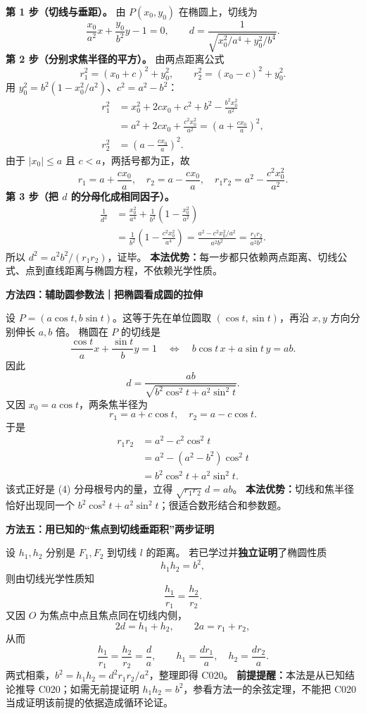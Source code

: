\begin{proofbox}
\textbf{第 1 步（切线与垂距）。}
由 $P(x_0,y_0)$ 在椭圆上，切线为
\[
\frac{x_0}{a^2}x+\frac{y_0}{b^2}y-1=0,
\qquad d=\frac{1}{\sqrt{x_0^2/a^4+y_0^2/b^4}}.
\]
\textbf{第 2 步（分别求焦半径的平方）。}
由两点距离公式
\[
r_1^2=(x_0+c)^2+y_0^2,\qquad
r_2^2=(x_0-c)^2+y_0^2.
\]
用 $y_0^2=b^2(1-x_0^2/a^2)$、$c^2=a^2-b^2$：
\[
\begin{aligned}
r_1^2
 &=x_0^2+2cx_0+c^2+b^2-\frac{b^2x_0^2}{a^2}\\
 &=a^2+2cx_0+\frac{c^2x_0^2}{a^2}
 =\left(a+\frac{cx_0}{a}\right)^2,\\
r_2^2
 &=\left(a-\frac{cx_0}{a}\right)^2.
\end{aligned}
\]
由于 $|x_0|\le a$ 且 $c<a$，两括号都为正，故
\[
r_1=a+\frac{cx_0}{a},\quad r_2=a-\frac{cx_0}{a},\quad
r_1r_2=a^2-\frac{c^2x_0^2}{a^2}.
\]
\textbf{第 3 步（把 $d$ 的分母化成相同因子）。}
\[
\begin{aligned}
\frac1{d^2}
 &=\frac{x_0^2}{a^4}+\frac{1}{b^2}\left(1-\frac{x_0^2}{a^2}\right)\\
 &=\frac1{b^2}\left(1-\frac{c^2x_0^2}{a^4}\right)
 =\frac{a^2-c^2x_0^2/a^2}{a^2b^2}
 =\frac{r_1r_2}{a^2b^2}.
\end{aligned}
\]
所以 $d^2=a^2b^2/(r_1r_2)$，证毕。
\textbf{本法优势：}每一步都只依赖两点距离、切线公式、点到直线距离与椭圆方程，不依赖光学性质。

\medskip
\textbf{\textcolor{CProof}{方法四：辅助圆参数法｜把椭圆看成圆的拉伸}}

设 $P=(a\cos t,b\sin t)$。这等于先在单位圆取 $(\cos t,\sin t)$，再沿 $x,y$ 方向分别伸长 $a,b$ 倍。
椭圆在 $P$ 的切线是
\[
\frac{\cos t}{a}x+\frac{\sin t}{b}y=1
\quad\Longleftrightarrow\quad
b\cos t\,x+a\sin t\,y=ab.
\]
因此
\[
\boxed{d=\frac{ab}{\sqrt{b^2\cos^2t+a^2\sin^2t}}}.\tag{4}
\]
又因 $x_0=a\cos t$，两条焦半径为
\[
r_1=a+c\cos t,\quad r_2=a-c\cos t.
\]
于是
\[
\begin{aligned}
r_1r_2
 &=a^2-c^2\cos^2t\\
 &=a^2-(a^2-b^2)\cos^2t\\
 &=b^2\cos^2t+a^2\sin^2t.
\end{aligned}
\]
该式正好是 (4) 分母根号内的量，立得
$\sqrt{r_1r_2}\,d=ab$。
\textbf{本法优势：}切线和焦半径恰好出现同一个 $b^2\cos^2t+a^2\sin^2t$；很适合数形结合和参数题。

\medskip
\textbf{\textcolor{CProof}{方法五：用已知的“焦点到切线垂距积”两步证明}}

设 $h_1,h_2$ 分别是 $F_1,F_2$ 到切线 $l$ 的距离。
若已学过并\textbf{独立证明}了椭圆性质
\[
\boxed{h_1h_2=b^2},
\]
则由切线光学性质知
\[
\frac{h_1}{r_1}=\frac{h_2}{r_2}.
\]
又因 $O$ 为焦点中点且焦点同在切线内侧，
\[
2d=h_1+h_2,\qquad2a=r_1+r_2,
\]
从而
\[
\frac{h_1}{r_1}=\frac{h_2}{r_2}=\frac{d}{a},\qquad
h_1=\frac{dr_1}{a},\quad h_2=\frac{dr_2}{a}.
\]
两式相乘，$b^2=h_1h_2=d^2r_1r_2/a^2$，整理即得 C020。
\textbf{前提提醒：}本法是从已知结论推导 C020；如需无前提证明 $h_1h_2=b^2$，参看方法一的余弦定理，不能把 C020 当成证明该前提的依据造成循环论证。


\end{proofbox}

